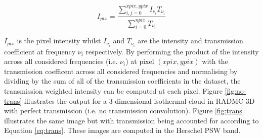 \documentclass{report}
\begin{document}
\begin{equation}
  I_{pix} = \frac{\sum_{i,j=0}^{xpix,ypix} I_{\nu_i} T_{\nu_i}}{\sum_{i=0}^{npix} T_{\nu_i}}
\end{equation}\label{eq:trans}

$I_{pix}$ is the pixel intensity whilst $I_{\nu_i}$ and $T_{\nu_i}$ are the intensity and transmission coefficient at frequency $\nu_i$ respectively.  By performing the product of the intensity across all considered frequencies (i.e. $\nu_i$) at pixel $(xpix,ypix)$ with the transmission coefficent across all considered frequencies and normalising by dividing by the sum of all of the transmission coefficients in the dataset, the transmission weighted intensity can be computed at each pixel. Figure \ref{fig:no-trans} illustrates the output for a 3-dimensional isothermal cloud in RADMC-3D with perfect transmission (i.e. no transmission convolution). Figure \ref{fig:trans} illustrates the same image but with transmission being accounted for according to Equation \ref{eq:trans}. These images are computed in the Herschel PSW band.
\end{document}
